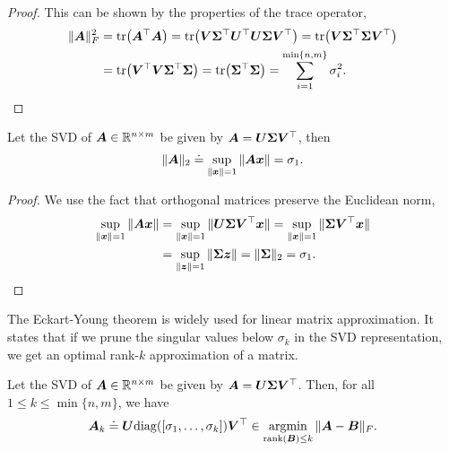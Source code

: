\begin{proof}
    This can be shown by the properties of the trace operator,
    \begin{align*}
        \| \mat{A} \|_F^2 & = \tr{\transpose{\mat{A}} \mat{A}} = \tr{\mat{V} \transpose{\mat{\Sigma}} \transpose{\mat{U}} \mat{U} \mat{\Sigma} \transpose{\mat{V}}} = \tr{\mat{V} \transpose{\mat{\Sigma}} \mat{\Sigma} \transpose{\mat{V}}} \\
                          & = \tr{\transpose{\mat{V}} \mat{V} \transpose{\mat{\Sigma}} \mat{\Sigma}} = \tr{\transpose{\mat{\Sigma}} \mat{\Sigma}} = \sum_{i=1}^{\min \{ n,m \}} \sigma_i^2.
    \end{align*}
\end{proof}

\begin{lemma}
    \label{lem:svd-spectral}
    Let the SVD of $\bm{A} \in \mathbb{R}^{n \times m}$ be given by $\bm{A} = \bm{U} \bm{\Sigma} \bm{V}^\top$, then \[
        \| \bm{A} \|_2 \doteq \sup_{\| \bm{x} \| = 1} \| \bm{A} \bm{x} \| = \sigma_1.
    \]
\end{lemma}

\begin{proof}
    We use the fact that orthogonal matrices preserve the Euclidean norm,
    \begin{align*}
        \sup_{\| \bm{x} \| = 1} \| \bm{A} \bm{x} \| & = \sup_{\| \bm{x} \| = 1} \| \bm{U} \bm{\Sigma} \bm{V}^\top \bm{x} \| = \sup_{\| \bm{x} \| = 1} \| \bm{\Sigma} \bm{V}^\top \bm{x} \| \\
                                                       & = \sup_{\| \bm{z} \| = 1} \| \bm{\Sigma} \bm{z} \| = \| \bm{\Sigma} \|_2 = \sigma_1.
    \end{align*}
\end{proof}

The Eckart-Young theorem is widely used for linear matrix approximation. It states that if we prune
the singular values below $\sigma_k$ in the SVD representation, we get an optimal rank-$k$
approximation of a matrix.

\begin{theorem}
    Let the SVD of $\bm{A} \in \mathbb{R}^{n \times m}$ be given by $\bm{A} = \bm{U} \bm{\Sigma}
        \bm{V}^\top$. Then, for all $1 \leq k \leq \min\{n, m\}$, we have \[
        \bm{A}_k \doteq \bm{U} \mathrm{diag}([\sigma_1, \ldots, \sigma_k]) \bm{V}^\top \in \operatorname*{argmin}_{\mathrm{rank}(\bm{B}) \leq k} \| \bm{A} - \bm{B} \|_F.
    \]
\end{theorem}

